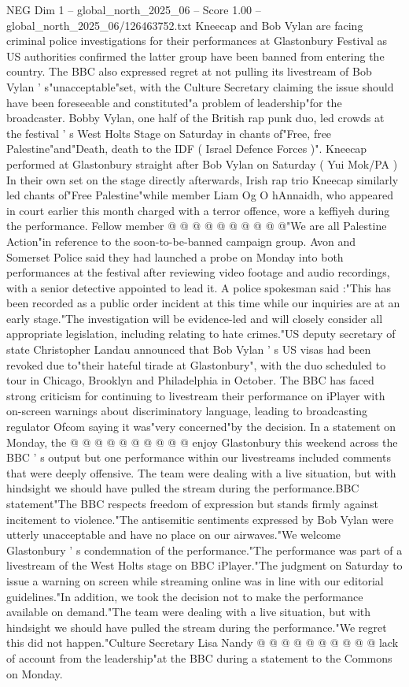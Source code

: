 \begin{textsample}{NEG Dim 1 – global\_north\_2025\_06 – Score 1.00 – global\_north\_2025\_06/126463752.txt}  \label{ex:f1_neg_126}
Kneecap and Bob Vylan are facing criminal police investigations for their performances at Glastonbury Festival as US authorities confirmed the latter group have been banned from entering the country.
The BBC also expressed regret at not pulling its livestream of Bob Vylan ' s"unacceptable"set, with the Culture Secretary claiming the issue should have been foreseeable and constituted"a problem of leadership"for the broadcaster.
Bobby Vylan, one half of the British rap punk duo, led crowds at the festival ' s West Holts Stage on Saturday in chants of"Free, free Palestine"and"Death, death to the IDF ( Israel Defence Forces )".
Kneecap performed at Glastonbury straight after Bob Vylan on Saturday ( Yui Mok/PA ) In their own set on the stage directly afterwards, Irish rap trio Kneecap similarly led chants of"Free Palestine"while member Liam Og O hAnnaidh, who appeared in court earlier this month charged with a terror offence, wore a keffiyeh during the performance.
Fellow member @ @ @ @ @ @ @ @ @ @"We are all Palestine Action"in reference to the soon-to-be-banned campaign group.
Avon and Somerset Police said they had launched a probe on Monday into both performances at the festival after reviewing video footage and audio recordings, with a senior detective appointed to lead it.
A police spokesman said :"This has been recorded as a public order incident at this time while our inquiries are at an early stage."The investigation will be evidence-led and will closely consider all appropriate legislation, including relating to hate crimes."US deputy secretary of state Christopher Landau announced that Bob Vylan ' s US visas had been revoked due to"their hateful tirade at Glastonbury", with the duo scheduled to tour in Chicago, Brooklyn and Philadelphia in October.
The BBC has faced strong criticism for continuing to livestream their performance on iPlayer with on-screen warnings about discriminatory language, leading to broadcasting regulator Ofcom saying it was"very concerned"by the decision.
In a statement on Monday, the @ @ @ @ @ @ @ @ @ @ enjoy Glastonbury this weekend across the BBC ' s output but one performance within our livestreams included comments that were deeply offensive.
The team were dealing with a live situation, but with hindsight we should have pulled the stream during the performance.BBC statement"The BBC respects freedom of expression but stands firmly against incitement to violence."The antisemitic sentiments expressed by Bob Vylan were utterly unacceptable and have no place on our airwaves."We welcome Glastonbury ' s condemnation of the performance."The performance was part of a livestream of the West Holts stage on BBC iPlayer."The judgment on Saturday to issue a warning on screen while streaming online was in line with our editorial guidelines."In addition, we took the decision not to make the performance available on demand."The team were dealing with a live situation, but with hindsight we should have pulled the stream during the performance."We regret this did not happen."Culture Secretary Lisa Nandy @ @ @ @ @ @ @ @ @ @ lack of account from the leadership"at the BBC during a statement to the Commons on Monday.

\end{textsample}
